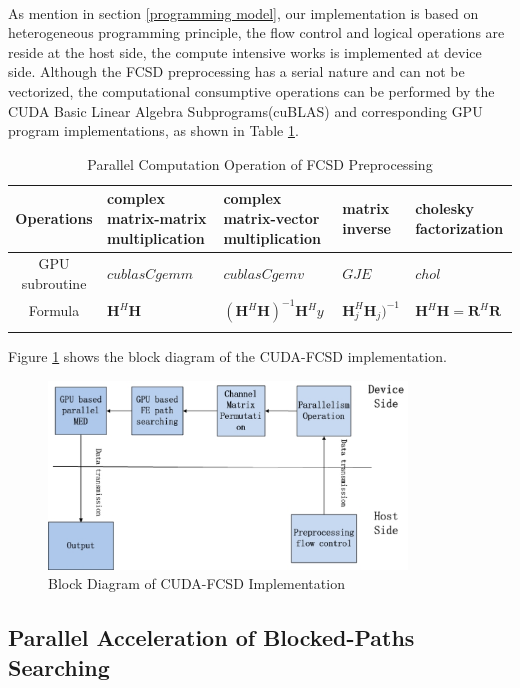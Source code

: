 \documentclass[12pt,a4paper,final]{article}
\begin{document}
\begin{spacing}{2.5}
\paragraph{}As mention in section \ref{programming model}, our implementation is based on heterogeneous programming principle, the flow control and logical operations are reside at the host side, the compute intensive works is implemented at device side. Although the FCSD preprocessing has a serial nature and can not be vectorized, the computational consumptive operations can be performed by the CUDA Basic Linear Algebra Subprograms(cuBLAS) and corresponding GPU program implementations, as shown in Table \ref{table 1}.
\begin{table}[htb]
\caption{Parallel Computation Operation of FCSD Preprocessing}
\centering
\begin{tabular}{|c|p{3cm}|p{3cm}|p{3cm}|p{3cm}|}
\hline
Operations & complex matrix-matrix multiplication & complex matrix-vector multiplication & matrix inverse & cholesky factorization \\
\hline
GPU subroutine & $\mathit{cublasCgemm}$  & $\mathit{cublasCgemv}$ & $\mathit{GJE}$ & $\mathit{chol}$\\
\hline
Formula   &  $\mathbf{H}^{H}\mathbf{H}$ & $(\mathbf{H}^{H}\mathbf{H})^{-1}\mathbf{H}^{H}y$ & $\mathbf{H}_{j}^{H}\mathbf{H}_{j})^{-1} $ & $\mathbf{H}^{H}\mathbf{H}=\mathbf{R}^{H}\mathbf{R}$ 
\\
\hline
  \label{table 1}
\end{tabular}
\end{table}

Figure \ref{block diagram} shows the block diagram of the CUDA-FCSD implementation. 
\begin{figure}[htb]
\centering
\includegraphics[width=0.85\textwidth]{CUDA_FCSD_block_diagram.eps}
\caption{Block Diagram of CUDA-FCSD Implementation}
\label{block diagram}
\end{figure}
\subsection{Parallel Acceleration of Blocked-Paths Searching}

\end{spacing}
\end{document}
